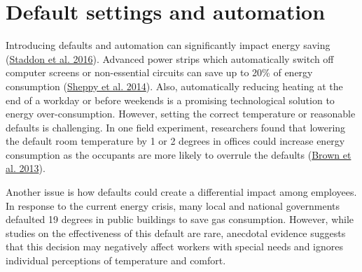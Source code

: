 \documentclass[
  11pt,
  captions=heading]{scrreport}
\begin{document}
\hypertarget{default-settings-and-automation}{%
\section{Default settings and
automation}\label{default-settings-and-automation}}

Introducing defaults and automation can significantly impact energy
saving (\protect\hyperlink{ref-staddon2016intervening}{Staddon et al.
2016}). Advanced power strips which automatically switch off computer
screens or non-essential circuits can save up to 20\% of energy
consumption (\protect\hyperlink{ref-sheppy2014reducing}{Sheppy et al.
2014}). Also, automatically reducing heating at the end of a workday or
before weekends is a promising technological solution to energy
over-consumption. However, setting the correct temperature or reasonable
defaults is challenging. In one field experiment, researchers found that
lowering the default room temperature by 1 or 2 degrees in offices could
increase energy consumption as the occupants are more likely to overrule
the defaults (\protect\hyperlink{ref-brown2013testing}{Brown et al.
2013}).

Another issue is how defaults could create a differential impact among
employees. In response to the current energy crisis, many local and
national governments defaulted 19 degrees in public buildings to save
gas consumption. However, while studies on the effectiveness of this
default are rare, anecdotal evidence suggests that this decision may
negatively affect workers with special needs and ignores individual
perceptions of temperature and comfort.
\end{document}
